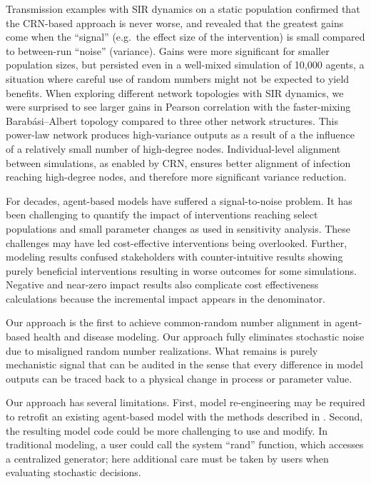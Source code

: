 \documentclass[10pt,letterpaper]{article}
\newcommand{\ba}{Barab\'asi--Albert }
\begin{document}
Transmission examples with SIR dynamics on a static population confirmed that the CRN-based approach is never worse, and revealed that the greatest gains come when the ``signal'' (e.g.~the effect size of the intervention) is small compared to between-run ``noise'' (variance). Gains were more significant for smaller population sizes, but persisted even in a well-mixed simulation of 10,000 agents, a situation where careful use of random numbers might not be expected to yield benefits. When exploring different network topologies with SIR dynamics, we were surprised to see larger gains in Pearson correlation with the faster-mixing \ba topology compared to three other network structures. This power-law network produces high-variance outputs as a result of a the influence of a relatively small number of high-degree nodes. Individual-level alignment between simulations, as enabled by CRN, ensures better alignment of infection reaching high-degree nodes, and therefore more significant variance reduction.

For decades, agent-based models have suffered a signal-to-noise problem. It has been challenging to quantify the impact of interventions reaching select populations and small parameter changes as used in sensitivity analysis. These challenges may have led cost-effective interventions being overlooked. Further, modeling results confused stakeholders with counter-intuitive results showing purely beneficial interventions resulting in worse outcomes for some simulations. Negative and near-zero impact results also complicate cost effectiveness calculations because the incremental impact appears in the denominator.

Our approach is the first to achieve common-random number alignment in agent-based health and disease modeling. Our approach fully eliminates stochastic noise due to misaligned random number realizations. What remains is purely mechanistic signal that can be audited in the sense that every difference in model outputs can be traced back to a physical change in process or parameter value.

Our approach has several limitations.  First, model re-engineering may be required to retrofit an existing agent-based model with the methods described in . Second, the resulting model code could be more challenging to use and modify. In traditional modeling, a user could call the system ``rand'' function, which accesses a centralized generator; here additional care must be taken by users when evaluating stochastic decisions.
\end{document}
